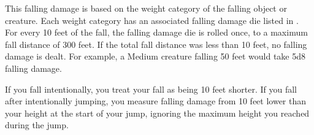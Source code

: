     This falling damage is based on the weight category of the falling object or creature.
    Each weight category has an associated falling damage die listed in .
    For every 10 feet of the fall, the falling damage die is rolled once, to a maximum fall distance of 300 feet.
    If the total fall distance was less than 10 feet, no falling damage is dealt.
    For example, a Medium creature falling 50 feet would take 5d8 falling damage.

    If you fall intentionally, you treat your fall as being 10 feet shorter.
    If you fall after intentionally jumping, you measure falling damage from 10 feet lower than your height at the start of your jump, ignoring the maximum height you reached during the jump.

